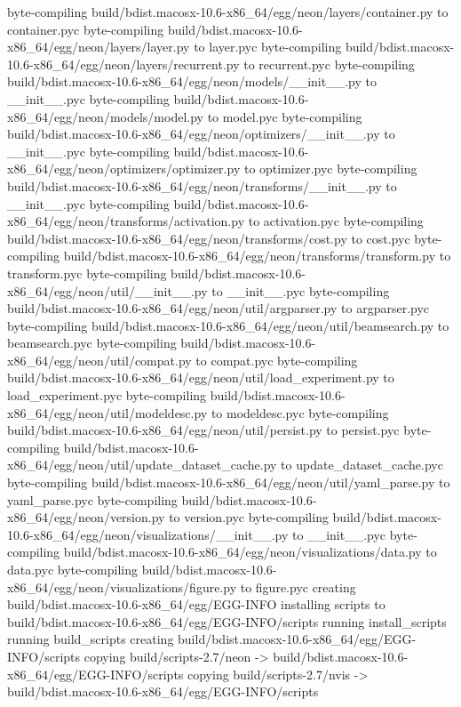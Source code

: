 byte-compiling build/bdist.macosx-10.6-x86_64/egg/neon/layers/container.py to container.pyc
byte-compiling build/bdist.macosx-10.6-x86_64/egg/neon/layers/layer.py to layer.pyc
byte-compiling build/bdist.macosx-10.6-x86_64/egg/neon/layers/recurrent.py to recurrent.pyc
byte-compiling build/bdist.macosx-10.6-x86_64/egg/neon/models/__init__.py to __init__.pyc
byte-compiling build/bdist.macosx-10.6-x86_64/egg/neon/models/model.py to model.pyc
byte-compiling build/bdist.macosx-10.6-x86_64/egg/neon/optimizers/__init__.py to __init__.pyc
byte-compiling build/bdist.macosx-10.6-x86_64/egg/neon/optimizers/optimizer.py to optimizer.pyc
byte-compiling build/bdist.macosx-10.6-x86_64/egg/neon/transforms/__init__.py to __init__.pyc
byte-compiling build/bdist.macosx-10.6-x86_64/egg/neon/transforms/activation.py to activation.pyc
byte-compiling build/bdist.macosx-10.6-x86_64/egg/neon/transforms/cost.py to cost.pyc
byte-compiling build/bdist.macosx-10.6-x86_64/egg/neon/transforms/transform.py to transform.pyc
byte-compiling build/bdist.macosx-10.6-x86_64/egg/neon/util/__init__.py to __init__.pyc
byte-compiling build/bdist.macosx-10.6-x86_64/egg/neon/util/argparser.py to argparser.pyc
byte-compiling build/bdist.macosx-10.6-x86_64/egg/neon/util/beamsearch.py to beamsearch.pyc
byte-compiling build/bdist.macosx-10.6-x86_64/egg/neon/util/compat.py to compat.pyc
byte-compiling build/bdist.macosx-10.6-x86_64/egg/neon/util/load_experiment.py to load_experiment.pyc
byte-compiling build/bdist.macosx-10.6-x86_64/egg/neon/util/modeldesc.py to modeldesc.pyc
byte-compiling build/bdist.macosx-10.6-x86_64/egg/neon/util/persist.py to persist.pyc
byte-compiling build/bdist.macosx-10.6-x86_64/egg/neon/util/update_dataset_cache.py to update_dataset_cache.pyc
byte-compiling build/bdist.macosx-10.6-x86_64/egg/neon/util/yaml_parse.py to yaml_parse.pyc
byte-compiling build/bdist.macosx-10.6-x86_64/egg/neon/version.py to version.pyc
byte-compiling build/bdist.macosx-10.6-x86_64/egg/neon/visualizations/__init__.py to __init__.pyc
byte-compiling build/bdist.macosx-10.6-x86_64/egg/neon/visualizations/data.py to data.pyc
byte-compiling build/bdist.macosx-10.6-x86_64/egg/neon/visualizations/figure.py to figure.pyc
creating build/bdist.macosx-10.6-x86_64/egg/EGG-INFO
installing scripts to build/bdist.macosx-10.6-x86_64/egg/EGG-INFO/scripts
running install_scripts
running build_scripts
creating build/bdist.macosx-10.6-x86_64/egg/EGG-INFO/scripts
copying build/scripts-2.7/neon -> build/bdist.macosx-10.6-x86_64/egg/EGG-INFO/scripts
copying build/scripts-2.7/nvis -> build/bdist.macosx-10.6-x86_64/egg/EGG-INFO/scripts
